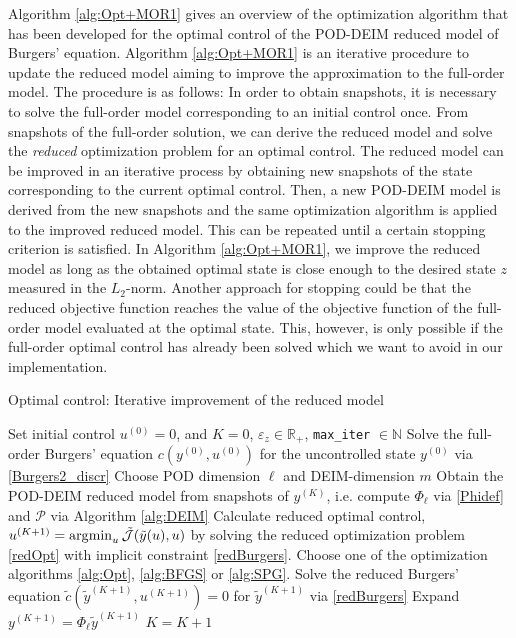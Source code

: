 Algorithm \ref{alg:Opt+MOR1} gives an overview of the optimization algorithm that has been developed for the optimal control of the POD-DEIM reduced model of Burgers' equation. Algorithm \ref{alg:Opt+MOR1} is an iterative procedure to update the reduced model aiming to improve the approximation to the full-order model. The procedure is as follows: In order to obtain snapshots, it is necessary to solve the full-order model corresponding to an initial control once. From snapshots of the full-order solution, we can derive the reduced model and solve the \textit{reduced} optimization problem for an optimal control. The reduced model can be improved in an iterative process by obtaining new snapshots of the state corresponding to the current optimal control. Then, a new POD-DEIM model is derived from the new snapshots and the same optimization algorithm is applied to the improved reduced model. This can be repeated until a certain stopping criterion is satisfied. In Algorithm \ref{alg:Opt+MOR1}, we improve the reduced model as long as the obtained optimal state is close enough to the desired state $z$ measured in the $L_2$-norm. Another approach for stopping could be that the reduced objective function reaches the value of the objective function of the full-order model evaluated at the optimal state. This, however, is only possible if the full-order optimal control has already been solved which we want to avoid in our implementation.
\newpage
\begin{algorithm}[H]
\caption{Optimal control: Iterative improvement of the reduced model}
\label{alg:Opt+MOR1}
\begin{algorithmic}[1]
\STATE Set initial control $u^{(0)} = 0$, and $K = 0$, $\varepsilon_z \in \mathbb{R}_+$, \texttt{max\_iter} $\in \mathbb{N}$
\STATE Solve the full-order Burgers' equation $c(y^{(0)},u^{(0)})$ for the uncontrolled state $y^{(0)}$ via \eqref{Burgers2_discr}
\STATE Choose POD dimension $\ell$ and DEIM-dimension $m$
\STATE Obtain the POD-DEIM reduced model from snapshots of $y^{(K)}$, i.e. compute $\Phi_\ell$ via \eqref{Phidef} and $\mathcal{P}$ via Algorithm \ref{alg:DEIM}
\STATE Calculate reduced optimal control, $u^{(K+1)} = \operatorname*{\arg\!\min}_u \tilde{\mathcal J}(\tilde{y}(u),u)$ by solving the reduced optimization problem \eqref{redOpt} with implicit constraint \eqref{redBurgers}. Choose one of the optimization algorithms \ref{alg:Opt}, \ref{alg:BFGS} or \ref{alg:SPG}.
\STATE Solve the reduced Burgers' equation $\tilde{c}(\tilde{y}^{(K+1)},u^{(K+1)}) = 0$ for $\tilde{y}^{(K+1)}$ via \eqref{redBurgers}
\STATE Expand $y^{(K+1)} = \Phi_\ell \tilde{y}^{(K+1)}$
\STATE $K = K + 1$
\ENDWHILE
\end{algorithmic}
\end{algorithm}
